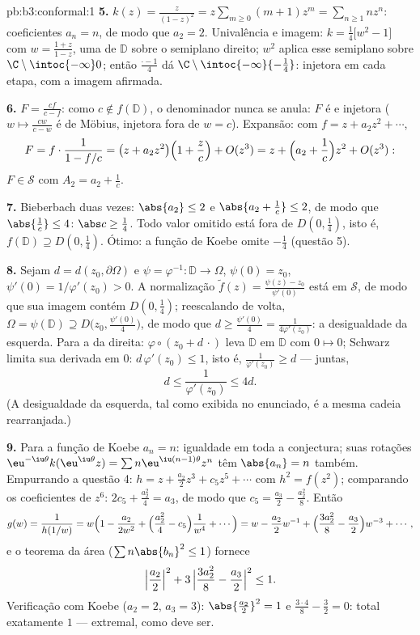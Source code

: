\begin{solution}{pb:b3:conformal:1}
\textbf{5.} $k(z) = \frac z{(1-z)^2} = z\sum_{m\geq0}(m +
1)z^m = \sum_{n\geq1}nz^n$: coeficientes $a_n = n$, de modo que $a_2 =
2$. Univalência e imagem: $k = \frac14\bigl[w^2 - 1\bigr]$
com $w = \frac{1 + z}{1 - z}$, uma  de $\mathbb D$
sobre o semiplano direito; $w^2$ aplica esse semiplano
 sobre $\C\setminus\intoc{-\infty}0$; então
$\frac{\cdot - 1}4$ dá
$\C\setminus\intoc{-\infty}{-\frac14}$: injetora em cada
etapa, com a imagem afirmada.

\textbf{6.} $F = \frac{cf}{c - f}$: como $c \notin f(\mathbb
D)$, o denominador nunca se anula: $F$ é  e
injetora ($w \mapsto \frac{cw}{c - w}$ é de Möbius, injetora
fora de $w = c$). Expansão: com $f = z + a_2z^2 + \cdots$,
\[
F = f\cdot\frac1{1 - f/c} = \bigl(z + a_2z^2\bigr)\Bigl(1 +
\frac zc\Bigr) + O(z^3)
= z + \Bigl(a_2 + \frac1c\Bigr)z^2 + O(z^3):
\]
$F \in \mathcal S$ com $A_2 = a_2 + \frac1c$.

\textbf{7.} Bieberbach duas vezes: $\abs{a_2} \leq 2$ e
$\abs{a_2 + \frac1c} \leq 2$, de modo que $\abs{\frac1c} \leq 4$:
$\abs c \geq \frac14$. Todo valor omitido está fora de
$D(0,\frac14)$, isto é, $f(\mathbb D) \supseteq D(0, \frac14)$.
Ótimo: a função de Koebe omite $-\frac14$ (questão 5).

\textbf{8.} Sejam $d = d(z_0, \partial\Omega)$ e $\psi =
\varphi^{-1} \colon \mathbb D \to \Omega$, $\psi(0) = z_0$,
$\psi'(0) = 1/\varphi'(z_0) > 0$. A normalização $\tilde
f(z) = \frac{\psi(z) - z_0}{\psi'(0)}$ está em $\mathcal S$,
de modo que sua imagem contém $D(0, \frac14)$; reescalando de volta,
$\Omega = \psi(\mathbb D) \supseteq D\bigl(z_0,
\tfrac{\psi'(0)}4\bigr)$, de modo que $d \geq \frac{\psi'(0)}4 =
\frac1{4\varphi'(z_0)}$: a desigualdade da esquerda. Para a da direita: $\varphi\circ(z_0 + d\,\cdot)$
leva $\mathbb D$ em $\mathbb D$ com $0 \mapsto 0$; Schwarz
limita sua derivada em $0$: $d\,\varphi'(z_0) \leq 1$, isto é,
$\frac1{\varphi'(z_0)} \geq d$ --- juntas,
\[
d \leq \frac1{\varphi'(z_0)} \leq 4d .
\]
(A desigualdade da esquerda, tal como exibida no enunciado, é a
mesma cadeia rearranjada.)

\textbf{9.} Para a função de Koebe $a_n = n$: igualdade
em toda a conjectura; suas rotações
$\eu^{-\iu\theta}k(\eu^{\iu\theta}z) = \sum
n\eu^{\iu(n-1)\theta}z^n$ têm $\abs{a_n} = n$ também. Empurrando
a questão 4: $h = z + \frac{a_2}2z^3 + c_5z^5 + \cdots$ com
$h^2 = f(z^2)$; comparando os coeficientes de $z^6$: $2c_5 +
\frac{a_2^2}4 = a_3$, de modo que $c_5 = \frac{a_3}2 -
\frac{a_2^2}8$. Então
\[
g(w) = \frac1{h(1/w)} = w\Bigl(1 - \frac{a_2}{2w^2} +
\Bigl(\frac{a_2^2}4 - c_5\Bigr)\frac1{w^4} + \cdots\Bigr)
= w - \frac{a_2}2w^{-1} + \Bigl(\frac{3a_2^2}8 -
\frac{a_3}2\Bigr)w^{-3} + \cdots,
\]
e o teorema da área ($\sum n\abs{b_n}^2 \leq 1$) fornece
\[
\Bigl|\frac{a_2}2\Bigr|^2 + 3\,\Bigl|\frac{3a_2^2}8 -
\frac{a_3}2\Bigr|^2 \leq 1 .
\]
Verificação com Koebe ($a_2 = 2$, $a_3 = 3$): $\abs{\frac{a_2}2}^2 = 1$
e $\frac{3\cdot4}8 - \frac32 = 0$: total exatamente $1$ ---
extremal, como deve ser.


\end{solution}
